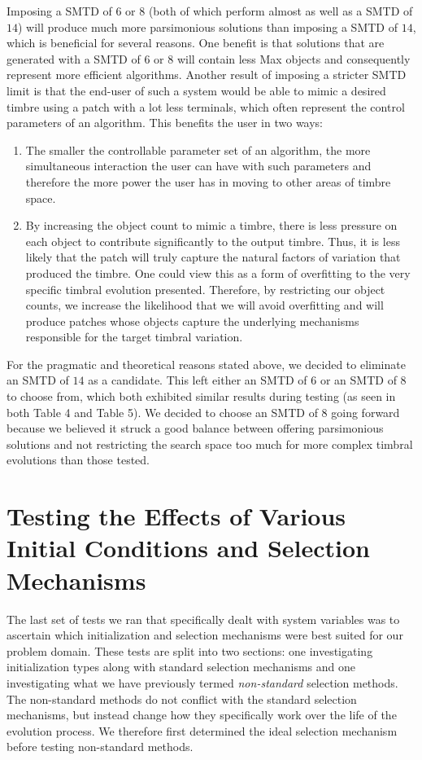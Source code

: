 \documentclass[12pt]{report} 	%
\numberwithin{figure}{chapter}
\numberwithin{table}{chapter}
\numberwithin{equation}{chapter}
\begin{document}
\begin{flushleft}
Imposing a SMTD of $6$ or $8$ (both of which perform almost as well as a SMTD of $14$) will produce much more parsimonious solutions than imposing a SMTD of $14$, which is beneficial for several reasons. One benefit is that solutions that are generated with a SMTD of $6$ or $8$ will contain less Max objects and consequently represent more efficient algorithms. Another result of imposing a stricter SMTD limit is that the end-user of such a system would be able to mimic a desired timbre using a patch with a lot less terminals, which often represent the control parameters of an algorithm. This benefits the user in two ways:
\begin{enumerate}
\item The smaller the controllable parameter set of an algorithm, the more simultaneous interaction the user can have with such parameters and therefore the more power the user has in moving to other areas of timbre space.
\item By increasing the object count to mimic a timbre, there is less pressure on each object to contribute significantly to the output timbre. Thus, it is less likely that the patch will truly capture the natural factors of variation that produced the timbre. One could view this as a form of overfitting to the very specific timbral evolution presented. Therefore, by restricting our object counts, we increase the likelihood that we will avoid overfitting and will produce patches whose objects capture the underlying mechanisms responsible for the target timbral variation.
\end{enumerate}

For the pragmatic and theoretical reasons stated above, we decided to eliminate an SMTD of $14$ as a candidate. This left either an SMTD of $6$ or an SMTD of $8$ to choose from, which both exhibited similar results during testing (as seen in both Table 4 and Table 5). We decided to choose an SMTD of $8$ going forward because we believed it struck a good balance between offering parsimonious solutions and not restricting the search space too much for more complex timbral evolutions than those tested. 

\section{Testing the Effects of Various Initial Conditions and Selection Mechanisms}
The last set of tests we ran that specifically dealt with system variables was to ascertain which initialization and selection mechanisms were best suited for our problem domain. These tests are split into two sections: one investigating initialization types along with standard selection mechanisms and one investigating what we have previously termed \textit{non-standard} selection methods. The non-standard methods do not conflict with the standard selection mechanisms, but instead change how they specifically work over the life of the evolution process. We therefore first determined the ideal selection mechanism before testing non-standard methods.


\end{flushleft}
\end{document}
